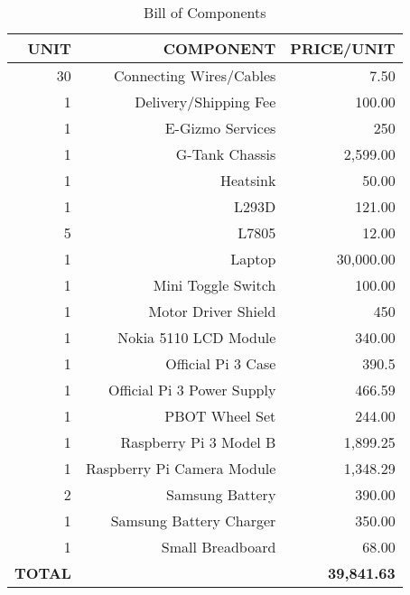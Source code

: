 \begin{table}[!h]
  \centering
  \caption{Bill of Components}
    \begin{tabular}{rrr}
    \toprule
    \textbf{UNIT} & \textbf{COMPONENT} & \textbf{PRICE/UNIT} \\
    \midrule
    
    30    & Connecting Wires/Cables & 7.50 \\
    1     & Delivery/Shipping Fee & 100.00 \\
    1     & E-Gizmo Services & 250 \\
    1     & G-Tank Chassis & 2,599.00 \\
    1     & Heatsink & 50.00 \\
    1     & L293D & 121.00 \\
    5     & L7805 & 12.00 \\
    1     & Laptop & 30,000.00 \\
    1     & Mini Toggle Switch & 100.00 \\
    1     & Motor Driver Shield & 450 \\
    1     & Nokia 5110 LCD Module & 340.00 \\
    1     & Official Pi 3 Case & 390.5 \\
    1     & Official Pi 3 Power Supply & 466.59 \\
    1     & PBOT Wheel Set & 244.00 \\
    1     & Raspberry Pi 3 Model B & 1,899.25 \\
    1     & Raspberry Pi Camera Module & 1,348.29 \\
    2     & Samsung Battery & 390.00 \\
    1     & Samsung Battery Charger & 350.00 \\
    1     & Small Breadboard & 68.00 \\

		\midrule
    \textbf{TOTAL} & \textbf{} & \textbf{~39,841.63 } \\
    \bottomrule
    \end{tabular}%
  \label{tab:addlabel}%
\end{table}%